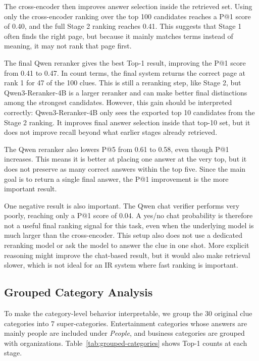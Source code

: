\documentclass[11pt]{article}
\begin{document}
The cross-encoder then improves answer selection inside the retrieved set. 
Using only the cross-encoder ranking over the top 100 candidates reaches a P@1 score of 0.40, and the full Stage 2 ranking reaches 0.41. 
This suggests that Stage 1 often finds the right page, but because it mainly matches terms instead of meaning, it may not rank that page first.

The final Qwen reranker gives the best Top-1 result, improving the P@1 score from 0.41 to 0.47. 
In count terms, the final system returns the correct page at rank 1 for 47 of the 100 clues. 
This is still a reranking step, like Stage 2, but Qwen3-Reranker-4B is a larger reranker and can make better final distinctions among the strongest candidates. 
However, this gain should be interpreted correctly: Qwen3-Reranker-4B only sees the exported top 10 candidates from the Stage 2 ranking. 
It improves final answer selection inside that top-10 set, but it does not improve recall beyond what earlier stages already retrieved.

The Qwen reranker also lowers P@5 from 0.61 to 0.58, even though P@1 increases. 
This means it is better at placing one answer at the very top, but it does not preserve as many correct answers within the top five. 
Since the main goal is to return a single final answer, the P@1 improvement is the more important result.

One negative result is also important. The Qwen chat verifier performs very poorly, reaching only a P@1 score of 0.04. 
A yes/no chat probability is therefore not a useful final ranking signal for this task, even when the underlying model is much larger than the cross-encoder. 
This setup also does not use a dedicated reranking model or ask the model to answer the clue in one shot. 
More explicit reasoning might improve the chat-based result, but it would also make retrieval slower, which is not ideal for an IR system where fast ranking is important.

\subsection{Grouped Category Analysis}

To make the category-level behavior interpretable, we group the 30 original clue categories into 7 super-categories. Entertainment categories whose answers are mainly people are included under \textit{People}, and business categories are grouped with organizations. Table~\ref{tab:grouped-categories} shows Top-1 counts at each stage.
\end{document}
